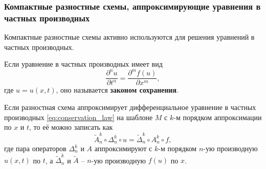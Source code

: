 \documentclass[../main.tex]{subfile}
\begin{document}
\subsubsection{Компактные разностные схемы, аппроксимирующие уравнения в частных
производных}
Компактные разностные схемы активно используются для решения уравнений в
частных производных.

\begin{define}
\label{eq:conservation_law}
	Если уравнение в частных производных имеет вид
	\[\frac{\partial^nu}{\partial t^n}=\frac{\partial^mf(u)}{\partial x^m},\]
	где $u=u(x,t)$, оно называется \textbf{законом сохранения}.
\end{define}

\begin{theorem}
	Если разностная схема аппроксимирует дифференциальное уравнение в
	частных производных \eqref{eq:conservation_law} на шаблоне $M$ с $k$-м
	порядком аппроксимации по $x$ и $t$, то её можно записать как
	\[\boxed{\widetilde{A}_n^k\circ\Delta_n^k\circ u=\widetilde{\Delta}_n^k
	\circ A_n^k\circ f},\]
	где пара операторов $\Delta_n^k$ и $A$ аппроксимируют с $k$-м порядком
	$n$-ую производную $u(x,t)$ по $t$, а $\widetilde\Delta_n^k$ и
	$\widetilde{A}$ -- $n$-ую производную $f(u)$ по $x$.
\end{theorem}
\end{document}
